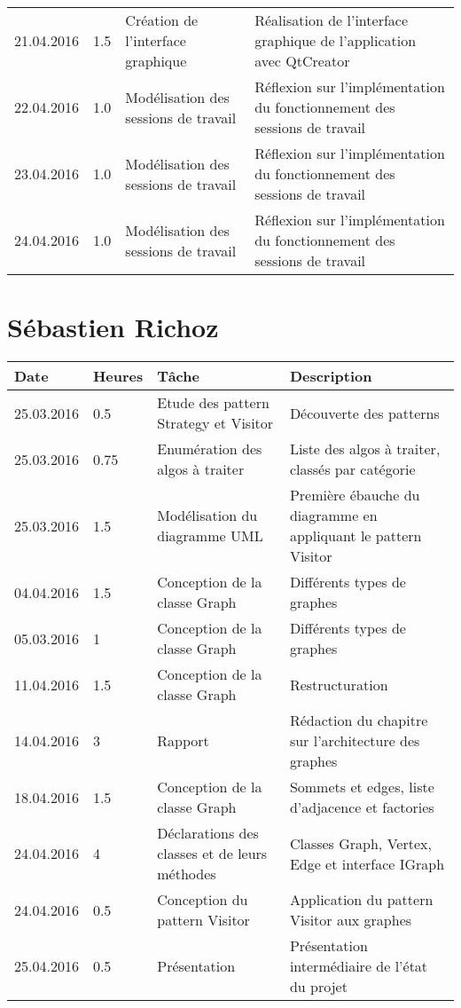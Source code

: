 \documentclass[french]{article}
\begin{document}
\begin{tabular}{p{}|p{}|p{}|p{}}
		\hline
		21.04.2016 & 1.5 & Création de l'interface graphique & Réalisation de l'interface graphique de l'application avec QtCreator\\
		22.04.2016 & 1.0 & Modélisation des sessions de travail & Réflexion sur l'implémentation du fonctionnement des sessions de travail\\
		23.04.2016 & 1.0 & Modélisation des sessions de travail & Réflexion sur l'implémentation du fonctionnement des sessions de travail\\
		24.04.2016 & 1.0 & Modélisation des sessions de travail & Réflexion sur l'implémentation du fonctionnement des sessions de travail\\
		
		
	\end{tabular}
	
	\section*{Sébastien Richoz}
	\begin{tabular}{p{}|p{}|p{}|p{}}
		Date&Heures&Tâche&Description\\
		\hline \hline
		25.03.2016&0.5&Etude des pattern Strategy et Visitor&Découverte des patterns\\
		\hline
		25.03.2016&0.75&Enumération des algos à traiter&Liste des algos à traiter, classés par catégorie\\
		\hline
		25.03.2016&1.5&Modélisation du diagramme UML&Première ébauche du diagramme en appliquant le pattern Visitor\\
		\hline
		04.04.2016&1.5&Conception de la classe Graph&Différents types de graphes\\
		\hline
		05.03.2016&1&Conception de la classe Graph&Différents types de graphes\\
		\hline
		11.04.2016&1.5&Conception de la classe Graph&Restructuration\\
		\hline
		14.04.2016&3&Rapport&Rédaction du chapitre sur l'architecture des graphes\\
		\hline
		18.04.2016&1.5&Conception de la classe Graph&Sommets et edges, liste d'adjacence et factories\\
		\hline
		24.04.2016&4&Déclarations des classes et de leurs méthodes&Classes Graph, Vertex, Edge et interface IGraph\\
		\hline
		24.04.2016&0.5&Conception du pattern Visitor&Application du pattern Visitor aux graphes\\
		\hline
		25.04.2016 & 0.5 & Présentation & Présentation intermédiaire de l'état du projet\\
		\hline
	\end{tabular}
	
\end{document}
